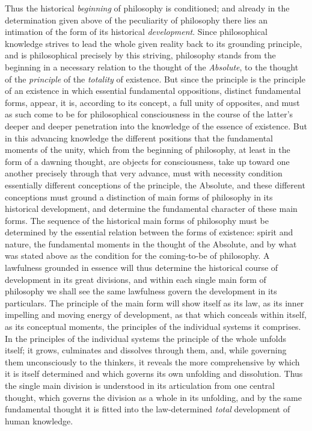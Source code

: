 Thus the historical \emph{beginning} of philosophy is conditioned; and
already in the determination given above of the peculiarity of
philosophy there lies an intimation of the form of its historical
\emph{development}. Since philosophical knowledge strives to lead the
whole given reality back to its grounding principle, and is
philosophical precisely by this striving, philosophy stands from the
beginning in a necessary relation to the thought of the
\emph{Absolute}, to the thought of the \emph{principle} of the
\emph{totality} of existence. But since the principle is the principle
of an existence in which essential fundamental oppositions, distinct
fundamental forms, appear, it is, according to its concept, a full unity
of opposites, and must as such come to be for philosophical
consciousness in the course of the latter's deeper and deeper
penetration into the knowledge of the essence of existence. But in this
advancing knowledge the different positions that the fundamental
moments of the unity, which from the beginning of philosophy, at least
in the form of a dawning thought, are objects for consciousness, take up
toward one another precisely through that very advance, must with
necessity condition essentially different conceptions of the principle,
the Absolute, and these different conceptions must ground a
distinction of main forms of philosophy in its historical
development, and determine the fundamental character of these main
forms. The sequence of the historical main forms of philosophy must be
determined by the essential relation between the forms of existence:
spirit and nature, the fundamental moments in the thought of the
Absolute, and by what was stated above as the condition for the
coming-to-be of philosophy. A lawfulness grounded in essence will thus
determine the historical course of development in its great divisions,
and within each single main form of philosophy we shall see the same
lawfulness govern the development in its particulars. The principle of
the main form will show itself as its law, as its inner impelling and
moving energy of development, as that which conceals within itself, as
its conceptual moments, the principles of the individual systems it
comprises. In the principles of the individual systems the principle of
the whole unfolds itself; it grows, culminates and dissolves through
them, and, while governing them unconsciously to the thinkers, it
reveals the more comprehensive by which it is itself determined and
which governs its own unfolding and dissolution. Thus the single main
division is understood in its articulation from one central thought,
which governs the division as a whole in its unfolding, and by the same
fundamental thought it is fitted into the law-determined
\emph{total} development of human knowledge.

